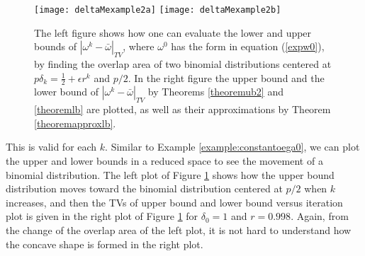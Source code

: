 \begin{example}
\begin{figure}
\centerline{{\texttt{[image: deltaMexample2a]}}
            {\texttt{[image: deltaMexample2b]}}}
\caption{\label{deltaMexample2}The left figure shows how one can evaluate the lower and upper
bounds of $|\omega^k-\bar{\omega}|_{TV}$, where $\omega^0$ has the form in equation (\ref{expw0}),
by finding the overlap area of two binomial distributions centered at
$p\delta_k=\frac{1}{2}+\epsilon r^k$ and $p/2$. In the right figure the upper bound and the lower
bound of $|\omega^k-\bar{\omega}|_{TV}$ by Theorems \ref{theoremub2} and \ref{theoremlb} are plotted,
as well as their approximations by Theorem \ref{theoremapproxlb}.}
\end{figure}
This is valid for each $k$. Similar to Example \ref{example:constantoega0}, we can plot the upper and lower bounds in a reduced space to see the movement of a binomial distribution. The left plot of Figure \ref{deltaMexample2} shows how the upper bound distribution moves toward the binomial distribution
centered at $p/2$ when $k$ increases, and then the TVs of upper bound and lower bound versus iteration plot is given
in the right plot of Figure \ref{deltaMexample2} for $\delta_0= 1$ and $r=0.998$.
Again, from the change of the overlap area of the left plot, it is not hard to understand how the concave shape is formed in the right plot.  


\end{example}
